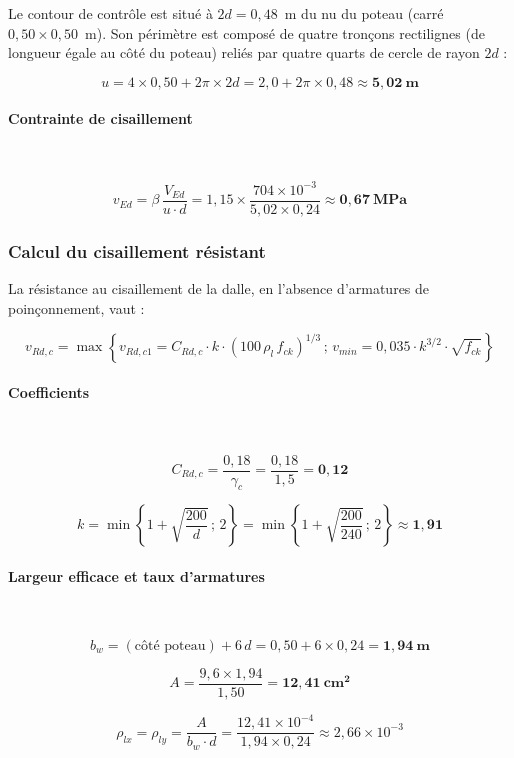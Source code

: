 Le contour de contrôle est situé à $2d = 0{,}48$~m du nu du poteau (carré $0{,}50 \times 0{,}50$~m). Son périmètre est composé de quatre tronçons rectilignes (de longueur égale au côté du poteau) reliés par quatre quarts de cercle de rayon $2d$ :

\[
u = 4 \times 0{,}50 + 2\pi \times 2d = 2{,}0 + 2\pi \times 0{,}48 \approx \mathbf{5{,}02~\text{m}}
\]

\paragraph{Contrainte de cisaillement}~

\[
v_{Ed} = \beta \, \frac{V_{Ed}}{u \cdot d} = 1{,}15 \times \frac{704 \times 10^{-3}}{5{,}02 \times 0{,}24} \approx \mathbf{0{,}67~\text{MPa}}
\]

\subsubsection{Calcul du cisaillement résistant}

La résistance au cisaillement de la dalle, en l'absence d'armatures de poinçonnement, vaut :

\[
v_{Rd,c} = \max\!\left\{ v_{Rd,c1} = C_{Rd,c} \cdot k \cdot (100 \, \rho_l \, f_{ck})^{1/3} \,;\, v_{min} = 0{,}035 \cdot k^{3/2} \cdot \sqrt{f_{ck}} \right\}
\]

\paragraph{Coefficients}~

\[
C_{Rd,c} = \frac{0{,}18}{\gamma_c} = \frac{0{,}18}{1{,}5} = \mathbf{0{,}12}
\]

\[
k = \min\!\left\{ 1 + \sqrt{\frac{200}{d}} \,;\, 2 \right\} = \min\!\left\{ 1 + \sqrt{\frac{200}{240}} \,;\, 2 \right\} \approx \mathbf{1{,}91}
\]

\paragraph{Largeur efficace et taux d'armatures}~

\[
b_w = (\text{côté poteau}) + 6\,d = 0{,}50 + 6 \times 0{,}24 = \mathbf{1{,}94~\text{m}}
\]

\[
A = \frac{9{,}6 \times 1{,}94}{1{,}50} = \mathbf{12{,}41~\text{cm}^2}
\]

\[
\rho_{lx} = \rho_{ly} = \frac{A}{b_w \cdot d} = \frac{12{,}41 \times 10^{-4}}{1{,}94 \times 0{,}24} \approx 2{,}66 \times 10^{-3}
\]

